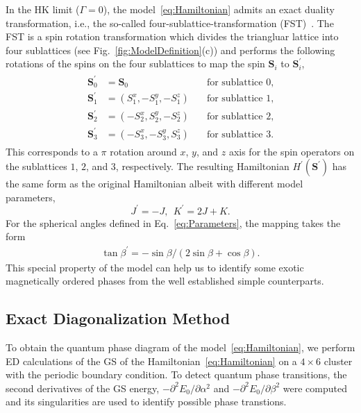 \documentclass[aps,prb,reprint,amsfonts,amsmath,amssymb,showpacs,groupedaddress,superscriptaddress]{revtex4-1}
\begin{document}
In the HK limit ($\Gamma=0$), the model~\eqref{eq:Hamiltonian} admits an exact duality transformation, i.e., the so-called four-sublattice-transformation (FST)~\cite{PhysRevB.89.014414}. The FST is a spin rotation transformation which divides the triangluar lattice into four sublattices (see Fig.~\ref{fig:ModelDefinition}(c)) and performs the following rotations of the spins on the four sublattices to map the spin $\bm{S}_{i}$ to $\bm{S}_{i}^{\prime}$,
\begin{eqnarray} \label{eq:FST}
  \begin{split}
  \bm{S}_{0}^{\prime} &= \bm{S}_{0} \quad &\text{for sublattice 0}, \\
  \bm{S}_{1}^{\prime} &= (S_1^x, -S_1^y, -S_1^z) \quad &\text{for sublattice 1}, \\
  \bm{S}_{2}^{\prime} &= (-S_2^x, S_2^y, -S_2^z) \quad &\text{for sublattice 2}, \\
  \bm{S}_{3}^{\prime} &= (-S_3^x, -S_3^y, S_3^z) \quad &\text{for sublattice 3}.
  \end{split}
\end{eqnarray}
This corresponds to a $\pi$ rotation around $x$, $y$, and $z$ axis for the spin operators on the sublattices $1$, $2$, and $3$, respectively. The resulting Hamiltonian $H^{\prime}(\bm{S}^{\prime})$ has the same form as the original Hamiltonian albeit with different model parameters,
\begin{equation}
J^{\prime} = -J, \ \ K^{\prime} = 2J + K.
 \label{eq:JK}
\end{equation}
For the spherical angles defined in Eq.~\eqref{eq:Parameters}, the mapping takes the form
\begin{align}
    \tan\beta^{\prime} = -\sin\beta / (2\sin\beta + \cos\beta).
    \label{eq:angle}
\end{align}
This special property of the model can help us to identify some exotic magnetically ordered phases from the well established simple counterparts.

\subsection{\label{subsec:MethodED}Exact Diagonalization Method}

To obtain the quantum phase diagram of the model~\eqref{eq:Hamiltonian}, we perform ED calculations of the GS of the Hamiltonian~\eqref{eq:Hamiltonian} on a $4 \times 6$ cluster with the periodic boundary condition. To detect quantum phase transitions, the second derivatives of the GS energy, $-\partial^2E_0/\partial\alpha^2$ and $-\partial^2E_0/\partial\beta^2$ were computed and its singularities are used to identify possible phase transtions.
\end{document}

